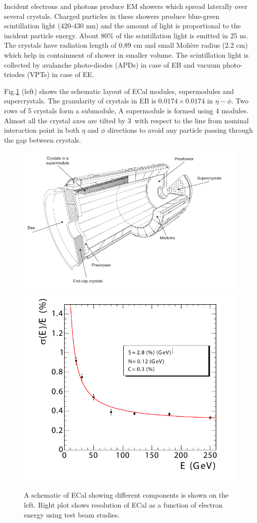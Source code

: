 Incident electrons and photons produce EM showers which spread laterally over several crystals. Charged particles in these showers produce blue-green scintillation light (420-430 nm) and the amount of light is proportional to the incident particle energy. About 80\% of the scintillation light is emitted in 25 ns. The crystals have radiation length of 0.89 cm and small Molière radius (2.2 cm) which help in containment of shower in smaller volume. The scintillation light is collected by avalanche photo-diodes (APDs) in case of EB and vacuum photo-triodes (VPTs) in case of EE. 

Fig.\ref{fig:Ecal_sche_res} (left) shows the schematic layout of ECal modules, supermodules and supercrystals. The granularity of crystals in EB is $0.0174\times 0.0174$ in $\eta-\phi$. Two rows of 5 crystals form a submodule, A supermodule is formed using 4 modules. Almost all the crystal axes are tilted by 3\textdegree\ with respect to the line from nominal interaction point in both $\eta$ and $\phi$ directions to avoid any particle passing through the gap between crystals.
\begin{figure}[h!]
\centering
\includegraphics[width=0.59\linewidth]{../Figures/Chap2/Ecal_schematic}
\includegraphics[width=0.4\linewidth]{../Figures/Chap2/ecalResolution}
\captionsetup{width=.95\linewidth}
\caption[ECal schematic and resolution]{A schematic of ECal showing different components is shown on the left. Right plot shows resolution of ECal as a function of electron energy using test beam studies.}
\label{fig:Ecal_sche_res}
\end{figure}

